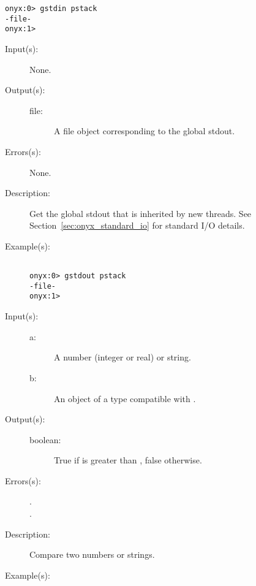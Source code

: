 \begin{description}
\begin{description}
\begin{verbatim}
onyx:0> gstdin pstack
-file-
onyx:1>
		\end{verbatim}
	\end{description}
\label{systemdict:gstdout}
\item[{\onyxop{--}{gstdout}{file}}: ]
	\begin{description}\item[]
	\item[Input(s): ] None.
	\item[Output(s): ]
		\begin{description}\item[]
		\item[file: ]
			A file object corresponding to the global stdout.
		\end{description}
	\item[Errors(s): ] None.
	\item[Description: ]
		Get the global stdout that is inherited by new threads.  See
		Section~\ref{sec:onyx_standard_io} for standard I/O details.
	\item[Example(s): ]\begin{verbatim}

onyx:0> gstdout pstack
-file-
onyx:1>
		\end{verbatim}
	\end{description}
\label{systemdict:gt}
\item[{\onyxop{a b}{gt}{boolean}}: ]
	\begin{description}\item[]
	\item[Input(s): ]
		\begin{description}\item[]
		\item[a: ]
			A number (integer or real) or string.
		\item[b: ]
			An object of a type compatible with .
		\end{description}
	\item[Output(s): ]
		\begin{description}\item[]
		\item[boolean: ]
			True if  is greater than , false
			otherwise.
		\end{description}
	\item[Errors(s): ]
		\begin{description}\item[]
		\item[.]
		\item[.]
		\end{description}
	\item[Description: ]
		Compare two numbers or strings.
	\item[Example(s): ]\begin{verbatim}


\end{verbatim}
\end{description}
\end{description}
